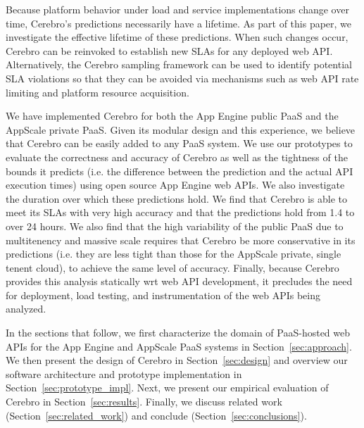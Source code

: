 Because platform behavior under load and service implementations change over time,
Cerebro's predictions necessarily have a lifetime.  
As part of this paper, we investigate
the effective lifetime of these predictions.  When such changes occur,
Cerebro can be reinvoked to establish new SLAs for any deployed web API.  Alternatively,
the Cerebro sampling framework can be used to identify potential SLA violations
so that they can be avoided via mechanisms such 
as web API rate limiting and platform resource acquisition.

We have implemented Cerebro for both the App Engine public PaaS and 
the AppScale private PaaS. Given its modular design and this experience, 
we believe that Cerebro can be easily added to any PaaS system.
We use our prototypes to evaluate the correctness and accuracy of Cerebro 
as well as the tightness
of the bounds it predicts (i.e. the difference between the prediction and 
the actual API execution times) using open source App Engine web APIs.  
We also investigate the duration over which 
these predictions hold.  We find that Cerebro is able to meet its SLAs with 
very high accuracy and that the predictions hold from 1.4 to over 24 hours.  
We also find that the high variability of the public PaaS due to multitenency
and massive scale requires that Cerebro be more conservative in its predictions
(i.e. they are less tight than those for the AppScale private, single tenent cloud), 
to achieve the same level of accuracy.  Finally, because Cerebro provides this 
analysis statically wrt web API development, 
it precludes the need for deployment, load testing, and
instrumentation of the web APIs being analyzed.

In the sections that follow, we first characterize the domain of 
PaaS-hosted web APIs for the App Engine and AppScale PaaS systems 
in Section~\ref{sec:approach}.   
We then present the design of Cerebro in Section~\ref{sec:design}
and overview our software architecture and prototype implementation
in Section~\ref{sec:prototype_impl}.
Next, we
present our empirical evaluation of Cerebro in 
Section~\ref{sec:results}.
Finally,  we discuss related work (Section~\ref{sec:related_work}) and 
conclude (Section~\ref{sec:conclusions}).
